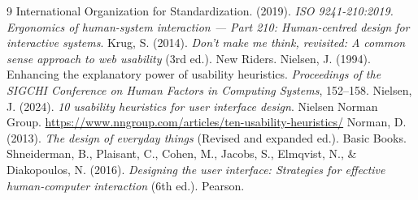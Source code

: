 \documentclass[12pt,a4paper]{article}
\begin{document}
\begin{thebibliography}{9}
 International Organization for Standardization. (2019). \emph{ISO 9241-210:2019. Ergonomics of human-system interaction — Part 210: Human-centred design for interactive systems}.
 Krug, S. (2014). \emph{Don't make me think, revisited: A common sense approach to web usability} (3rd ed.). New Riders.
 Nielsen, J. (1994). Enhancing the explanatory power of usability heuristics. \emph{Proceedings of the SIGCHI Conference on Human Factors in Computing Systems}, 152--158.
 Nielsen, J. (2024). \emph{10 usability heuristics for user interface design}. Nielsen Norman Group. \url{https://www.nngroup.com/articles/ten-usability-heuristics/}
 Norman, D. (2013). \emph{The design of everyday things} (Revised and expanded ed.). Basic Books.
 Shneiderman, B., Plaisant, C., Cohen, M., Jacobs, S., Elmqvist, N., \& Diakopoulos, N. (2016). \emph{Designing the user interface: Strategies for effective human-computer interaction} (6th ed.). Pearson.
\end{thebibliography}
\end{document}

